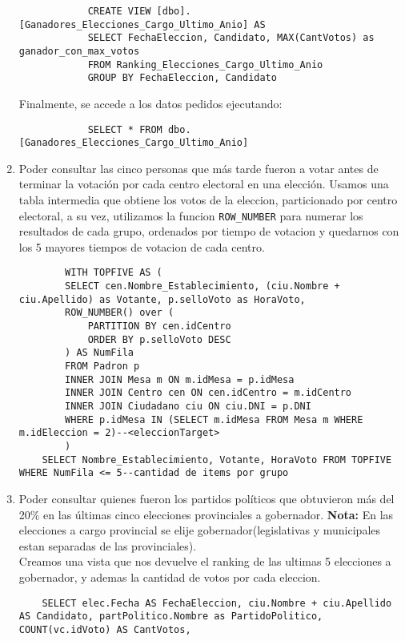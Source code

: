 \begin{enumerate}
		\begin{lstlisting}
			CREATE VIEW [dbo].[Ganadores_Elecciones_Cargo_Ultimo_Anio] AS
			SELECT FechaEleccion, Candidato, MAX(CantVotos) as ganador_con_max_votos
			FROM Ranking_Elecciones_Cargo_Ultimo_Anio
			GROUP BY FechaEleccion, Candidato
		\end{lstlisting}

		Finalmente, se accede a los datos pedidos ejecutando:
		\begin{lstlisting}
			SELECT * FROM dbo.[Ganadores_Elecciones_Cargo_Ultimo_Anio]
		\end{lstlisting}

	\item Poder consultar las cinco personas que más tarde fueron a votar antes de terminar
	la votación por cada centro electoral en una elección.
	Usamos una tabla intermedia que obtiene los votos de la eleccion, particionado por centro electoral, a su vez, utilizamos la funcion \texttt{ROW\_NUMBER} para numerar los resultados de cada grupo, ordenados por tiempo de votacion y quedarnos con los 5 mayores tiempos de votacion de cada centro.
	\begin{lstlisting}
		WITH TOPFIVE AS (
	    SELECT cen.Nombre_Establecimiento, (ciu.Nombre + ciu.Apellido) as Votante, p.selloVoto as HoraVoto,
	    ROW_NUMBER() over (
	        PARTITION BY cen.idCentro
	        ORDER BY p.selloVoto DESC
	    ) AS NumFila
	    FROM Padron p
	    INNER JOIN Mesa m ON m.idMesa = p.idMesa
	    INNER JOIN Centro cen ON cen.idCentro = m.idCentro
	    INNER JOIN Ciudadano ciu ON ciu.DNI = p.DNI
	    WHERE p.idMesa IN (SELECT m.idMesa FROM Mesa m WHERE m.idEleccion = 2)--<eleccionTarget>
		)
	SELECT Nombre_Establecimiento, Votante, HoraVoto FROM TOPFIVE WHERE NumFila <= 5--cantidad de items por grupo
	\end{lstlisting}

	\item Poder consultar quienes fueron los partidos políticos que obtuvieron más del 20\%
	en las últimas cinco elecciones provinciales a gobernador.
	\textbf{Nota:} En las elecciones a cargo provincial se elije gobernador(legislativas y municipales estan separadas de las provinciales).\\

Creamos una vista que nos devuelve el ranking de las ultimas 5 elecciones a gobernador, y ademas la cantidad de votos por cada eleccion.

\begin{lstlisting}
	SELECT elec.Fecha AS FechaEleccion, ciu.Nombre + ciu.Apellido AS Candidato, partPolitico.Nombre as PartidoPolitico, 
COUNT(vc.idVoto) AS CantVotos,  


\end{lstlisting}
\end{enumerate}
